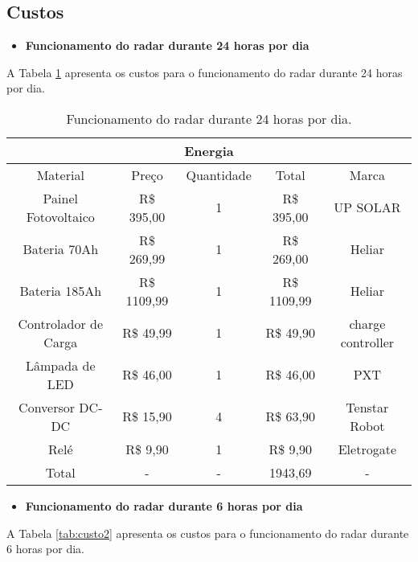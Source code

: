 \subsection{Custos}

\begin{itemize}
    \item \textbf{Funcionamento do radar durante 24 horas por dia}
\end{itemize}

A Tabela \ref{tab:custo1} apresenta os custos para o funcionamento do radar durante 24 horas por dia.

\begin{table}[H]
\caption{Funcionamento do radar durante 24 horas por dia.}\label{tab:custo1}
\begin{tabular}{|c|c|c|c|c|} 
\hline
\multicolumn{5}{|c|}{Energia}                                                 \\ \hline
Material             & Preço         & Quantidade & Total         & Marca     \\ \hline
Painel Fotovoltaico  & R\$ 395,00  & 1          & R\$ 395,00  & UP SOLAR    \\ \hline
Bateria 70Ah             & R\$ 269,99  & 1          & R\$ 269,00  & Heliar  \\ \hline
Bateria 185Ah             & R\$ 1109,99  & 1          & R\$ 1109,99  & Heliar  \\ \hline
Controlador de Carga & R\$ 49,99  & 1          & R\$ 49,90  & charge controller \\ \hline
Lâmpada de LED       & R\$ 46,00 & 1          & R\$ 46,00 & PXT         \\ \hline
Conversor DC-DC       & R\$ 15,90 & 4          & R\$ 63,90 & Tenstar Robot         \\ \hline
Relé       & R\$ 9,90 & 1          & R\$ 9,90 & Eletrogate         \\ \hline
Total & - & - & 1943,69 & - \\ \hline
\end{tabular}
\end{table}



\begin{itemize}
    \item \textbf{Funcionamento do radar durante 6 horas por dia}
\end{itemize}

A Tabela \ref{tab:custo2} apresenta os custos para o funcionamento do radar durante 6 horas por dia.

